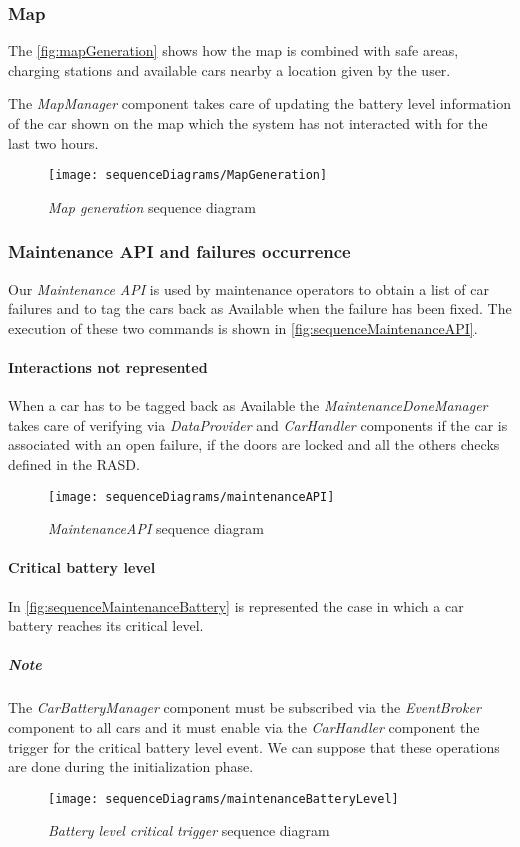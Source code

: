 \clearpage
\subsubsection{Map}
The \autoref{fig:mapGeneration} shows how the map is combined with safe areas, charging stations and available cars nearby a location given by the user.

The \emph{MapManager} component takes care of updating the battery level information of the car shown on the map which the system has not interacted with for the last two hours.

\begin{figure}[h!]
	\centering
	\texttt{[image: sequenceDiagrams/MapGeneration]}
	\caption{
		\label{fig:mapGeneration} 
		\emph{Map generation} sequence diagram
	}
\end{figure}

\clearpage
\subsubsection{Maintenance API and failures occurrence}
Our \emph{Maintenance API} is used by maintenance operators to obtain a list of car failures and to tag the cars back as Available when the failure has been fixed. The execution of these two commands is shown in \autoref{fig:sequenceMaintenanceAPI}.
\paragraph{Interactions not represented}When a car has to be tagged back as \mbox{Available} the \emph{MaintenanceDoneManager} takes care of verifying via \emph{DataProvider} and \emph{CarHandler} components if the car is associated with an open failure, if the doors are locked and all the others checks defined in the RASD.

\begin{figure}[h!]
	\centering
	\texttt{[image: sequenceDiagrams/maintenanceAPI]}
	\caption{
		\label{fig:sequenceMaintenanceAPI} 
		\emph{MaintenanceAPI} sequence diagram
	}
\end{figure}

\clearpage
\paragraph{Critical battery level}In \autoref{fig:sequenceMaintenanceBattery} is represented the case in which a car battery reaches its critical level.
\subparagraph{Note} The \emph{CarBatteryManager} component must be subscribed via the \mbox{\emph{EventBroker}} component to all cars and it must enable via the \emph{CarHandler} component the trigger for the critical battery level event. We can suppose that these operations are done during the initialization phase.
\begin{figure}[h!]
	\centering
	\texttt{[image: sequenceDiagrams/maintenanceBatteryLevel]}
	\caption{
		\label{fig:sequenceMaintenanceBattery} 
		\emph{Battery level critical trigger} sequence diagram
	}
\end{figure}

